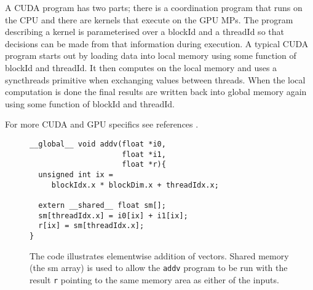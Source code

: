 A CUDA program has two parts; there is a coordination program that runs on the 
CPU and there are kernels that execute on the GPU MPs. The program describing 
a kernel is parameterised over a blockId and a threadId so that 
decisions can be made from that information during execution. A typical 
CUDA program starts out by loading data into local memory using some 
function of blockId and threadId. It then computes on the local memory 
and uses a syncthreads primitive when exchanging values between threads. 
When the local computation is done the final results are written back into 
global memory again using some function of blockId and threadId. 

For more CUDA and GPU specifics see references \cite{KEPLER,CUDA}. 

\begin{figure}
\begin{small}
\begin{verbatim}
__global__ void addv(float *i0, 
                     float *i1, 
                     float *r){ 
  unsigned int ix = 
     blockIdx.x * blockDim.x + threadIdx.x;

  extern __shared__ float sm[]; 
  sm[threadIdx.x] = i0[ix] + i1[ix]; 
  r[ix] = sm[threadIdx.x];
} 
\end{verbatim}
\end{small}
\caption{The code illustrates elementwise addition of vectors. Shared memory 
(the sm array) is used to allow the {\tt addv} program to be run with the 
result {\tt r} pointing to the same memory area as either of the inputs.} 
\label{fig:cudaKernel1}
\end{figure}

